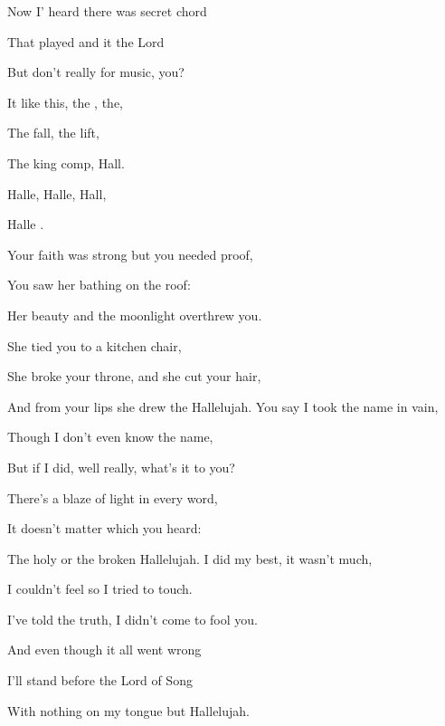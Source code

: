

      

\zs 
Now I' heard there was secret chord

That  played and it  the Lord

But  don't really  for music,  you? 

It  like this, the , the,

The  fall, the lift,

The  king comp, Hall.
\ks

\zr
Halle, Halle, Hall,

Halle  .  
\kr

\zs
Your faith was strong but you needed proof,

You saw her bathing on the roof:

Her beauty and the moonlight overthrew you.

She tied you to a kitchen chair,

She broke your throne, and she cut your hair,

And from your lips she drew the Hallelujah.
\ks
\zr \kr
\zs
You say I took the name in vain,

Though I don't even know the name,

But if I did, well really, what's it to you?

There's a blaze of light in every word,

It doesn't matter which you heard:

The holy or the broken Hallelujah.
\ks
\zr \kr
\zs
I did my best, it wasn't much,

I couldn't feel so I tried to touch.

I've told the truth, I didn't come to fool you.

And even though it all went wrong

I'll stand before the Lord of Song

With nothing on my tongue but Hallelujah.
\ks
\zr \kr
\kp
